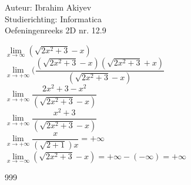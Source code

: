 \documentclass[a4paper]{article}
\begin{document}
\noindent \large Auteur: Ibrahim Akiyev \\
\noindent \large Studierichting: Informatica\\
\noindent \large Oefeningenreeks 2D nr. 12.9\\

\medskip

\normalsize

$\lim\limits_{x \to \infty} (\sqrt{2x^2 + 3} - x)$\\

$\lim\limits_{x \to +\infty} (\dfrac{(\sqrt{2x^2 + 3} - x)(\sqrt{2x^2 + 3} + x)}{(\sqrt{2x^2 + 3}-x)}$\\

$\lim\limits_{x \to +\infty} \dfrac{2x^2 + 3 - x^2}{(\sqrt{2x^2 +3} -x)}$\\

$\lim\limits_{x \to +\infty} \dfrac{x^2+3}{(\sqrt{2x^2 + 3} - x)}$\\

$\lim\limits_{x \to +\infty} \dfrac{x}{(\sqrt{2 + 1})x} = +\infty$\\


$\lim\limits_{x \to -\infty} (\sqrt{2x^2 + 3} - x) = +\infty -(-\infty) = +\infty$\\

\begin{thebibliography}{999}
\end{thebibliography}
\end{document}
